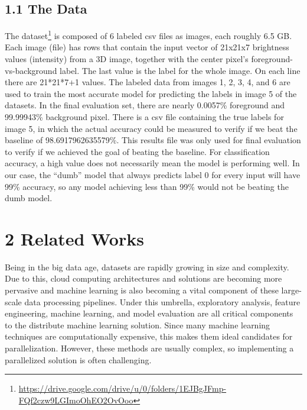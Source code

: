 \documentclass{neu_handout}
\begin{document}
\subsection*{1.1 The Data}
The dataset\footnote{\url{https://drive.google.com/drive/u/0/folders/1EJBgJFmp-FQf2czw9LGImoOhEO2OvOoo}} is composed of 6 labeled csv files as images, each roughly 6.5 GB. Each image (file) has rows that contain the input vector of 21x21x7
brightness values (intensity) from a 3D image, together with the center pixel's foreground-vs-background label. The last value is the label for the whole image. On each line there are 21*21*7+1 values. The labeled data from images 1, 2, 3, 4, and 6 are used to train the most accurate model for predicting the labels in image 5 of the datasets. In the final evaluation set, there are nearly 0.0057\% foreground and 99.99943\% background pixel. There is a csv file containing the true labels for image 5, in which the actual accuracy could be measured to verify if we beat the baseline of 98.6917962635579\%. This results file was only used for final evaluation to verify if we achieved the goal of beating the baseline. For classification accuracy, a high value does not necessarily mean the model is performing well. In our case, the ``dumb'' model that always predicts label 0 for every input will have 99\% accuracy, so any model achieving less than 99\% would not be beating the dumb model. \\



\section*{2 Related Works}
Being in the big data age, datasets are rapidly growing in size and complexity. Due to this, cloud computing architectures and solutions are becoming more pervasive and machine learning is also becoming a vital component of these large-scale data processing pipelines. Under this umbrella, exploratory analysis, feature engineering, machine learning, and model evaluation are all critical components to the distribute machine learning solution. Since many machine learning techniques are computationally expensive, this makes them ideal candidates for parallelization. However, these methods are usually complex, so implementing a parallelized solution is often challenging.\\
\end{document}
